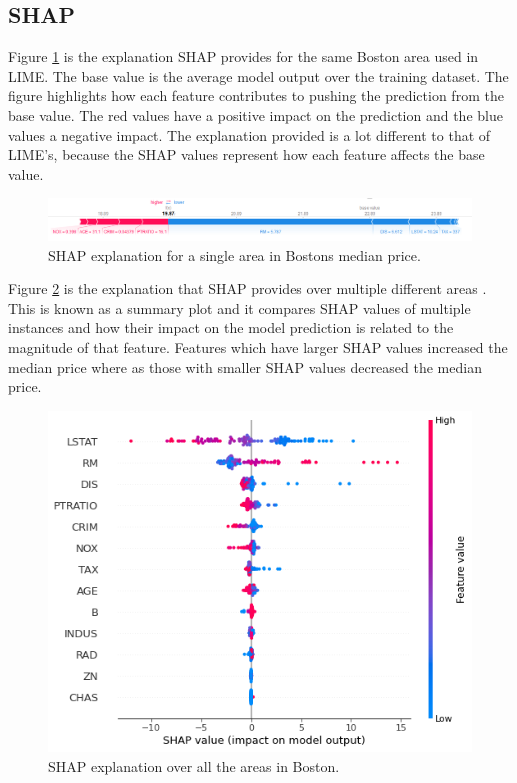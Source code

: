 \subsection{SHAP}
Figure \ref{fig:shap-house-single} is the explanation SHAP provides for the same Boston area used in LIME. The base value is the average model output over the training dataset. The figure highlights how each feature contributes to pushing the prediction from the base value. The red values have a positive impact on the prediction and the blue values a negative impact. The explanation provided is a lot different to that of LIME's, because the SHAP values represent how each feature affects the base value.
\begin  {figure}[!htpb]
  \includegraphics[width=\linewidth]{Evaluation_Images/house_indv_shap.png}
  \caption{SHAP explanation for a single area in Bostons median price.}
  \label{fig:shap-house-single}
\end{figure}
Figure \ref{fig:shap-house-entire} is the explanation that SHAP provides over multiple different areas . This is known as a summary plot and it compares SHAP values of multiple instances and how their impact on the model prediction is related to the magnitude of that feature. Features which have larger SHAP values increased the median price where as those with smaller SHAP values decreased the median price.
\begin  {figure}[!htpb]
  \includegraphics[width=\linewidth]{Evaluation_Images/house_shap.png}
  \caption{SHAP explanation over all the areas in Boston.}
  \label{fig:shap-house-entire}
\end{figure}
